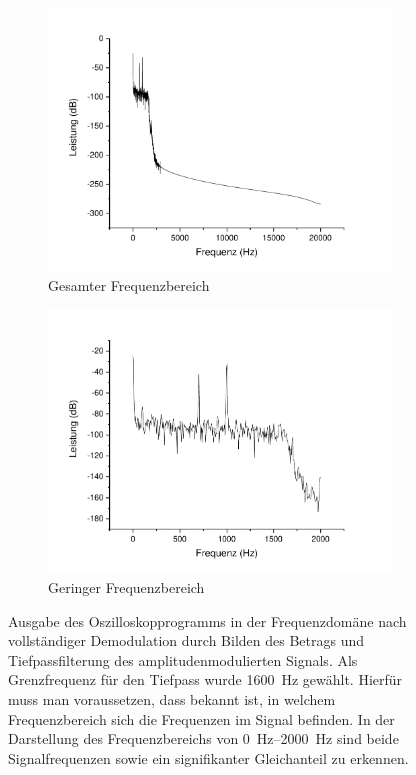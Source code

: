 \documentclass[
a4paper,
12pt,
pagesize,
ngerman
]{scrartcl}
\begin{document}
	\begin{figure}[H]
		\centering
		\begin{subfigure}[t]{0.495\textwidth}
			\centering
			\includegraphics[width=1\textwidth]{Origin-Files/AM-Demod-Betrag-demod}
			\caption{Gesamter Frequenzbereich}
		\end{subfigure}
		\begin{subfigure}[t]{0.495\textwidth}
			\centering
			\includegraphics[width=1\textwidth]{Origin-Files/AM-Demod-Betrag-demod-Bereich}
			\caption{Geringer Frequenzbereich}
		\end{subfigure}
		\label{fig_tag3_am_demod_betrag_vollst}
		\caption{Ausgabe des Oszilloskopprogramms in der Frequenzdomäne nach vollständiger Demodulation durch Bilden des Betrags und Tiefpassfilterung des amplitudenmodulierten Signals.
		Als Grenzfrequenz für den Tiefpass wurde \SI{1600}{\hertz} gewählt.
		Hierfür muss man voraussetzen, dass bekannt ist, in welchem Frequenzbereich sich die Frequenzen im Signal befinden.
		In der Darstellung des Frequenzbereichs von \SIrange{0}{2000}{\hertz} sind beide Signalfrequenzen sowie ein signifikanter Gleichanteil zu erkennen.
		}
		\centering
	\end{figure}
\end{document}
